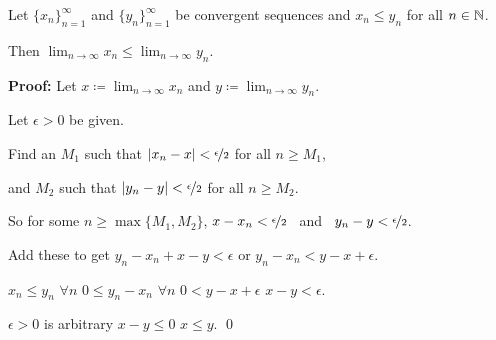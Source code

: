 \documentclass[10pt,aspectratio=149]{beamer}
\begin{document}
\begin{frame}

\begin{lemma}
Let $\{ x_n \}_{n=1}^\infty$ and $\{ y_n \}_{n=1}^\infty$ be
convergent sequences and
\quad $x_n \leq y_n$
\quad
for all $n \in {\mathbb{N}}$.

\pause
Then \quad 
$\displaystyle \lim_{n\to\infty} x_n \leq \lim_{n\to\infty} y_n$.
\end{lemma}

\pause
\textbf{Proof:}
Let $\displaystyle x \coloneqq \lim_{n\to\infty} x_n$
and $\displaystyle y \coloneqq \lim_{n\to\infty} y_n$. 

\medskip
\pause

Let 
$\epsilon > 0$ be given.

\medskip
\pause

Find an $M_1$ such that $\left\lvert {x_n-x} \right\rvert < \nicefrac{\epsilon}{2}$ for all $n \geq M_1$,

\pause
and $M_2$ such that $\left\lvert {y_n-y} \right\rvert < \nicefrac{\epsilon}{2}$
for all $n \geq M_2$.

\pause
\medskip

So for some $n \geq \max\{ M_1, M_2 \}$, \quad
$x-x_n < \nicefrac{\epsilon}{2}$ ~and~
$y_n-y < \nicefrac{\epsilon}{2}$.

\pause
\medskip

Add these to get
\quad $y_n-x_n+x-y < \epsilon$
\pause
\quad or \quad $y_n-x_n < y-x+ \epsilon$.

\pause
\medskip

$x_n \leq y_n$ $\forall n$
\pause
\wthus $0 \leq y_n-x_n$ $\forall n$
\pause
\wthus $0 < y-x+ \epsilon$
\pause
\wthus $x-y < \epsilon$.

\pause
\medskip

$\epsilon > 0$ is arbitrary
\pause
\wthus $x-y \leq 0$
\pause
\wthus $x \leq y$.
\qed

\end{frame}
\end{document}
